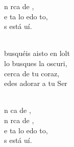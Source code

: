 \begin{cancion}
\begin{chorus}
	n rca de ,\\
	e ta lo edo to,\\
	s está uí.\\
	\end{chorus}%
	\jump\\
	 busquéis aisto en lolt\\
	 lo busques la oscuri,\\
	 cerca de   tu coraz,\\
	edes adorar a tu Ser\\\jump\\
	\begin{chorus}%
	n ca de , \\
	n rca de ,\\
	e ta lo edo to,\\
	s está uí.\\
	\end{chorus}%
	\jump\\
\end{cancion}%
